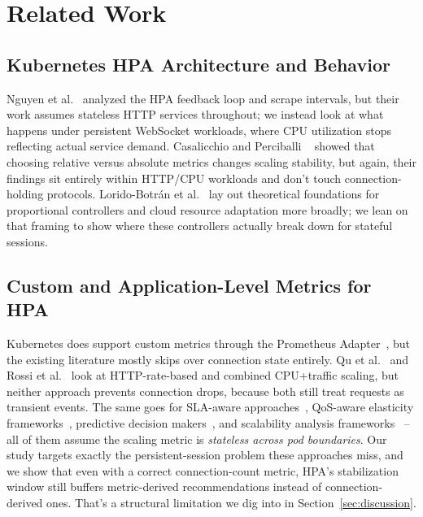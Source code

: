 \documentclass[pdflatex,sn-mathphys-num]{sn-jnl}
\theoremstyle{thmstyleone}%
\theoremstyle{thmstyletwo}%
\theoremstyle{thmstylethree}%
\begin{document}
\section{Related Work}
\label{sec:related}

\subsection{Kubernetes HPA Architecture and Behavior}

Nguyen et al.~\cite{nguyen2020hpa} analyzed the HPA feedback loop and scrape
intervals, but their work assumes stateless HTTP services throughout; we instead
look at what happens under persistent WebSocket workloads, where CPU utilization
stops reflecting actual service demand. Casalicchio and Perciballi
~\cite{casalicchio2019auto} showed that choosing relative versus absolute metrics
changes scaling stability, but again, their findings sit entirely within
HTTP/CPU workloads and don't touch connection-holding protocols. Lorido-Botr{\'a}n
et al.~\cite{lorido2014auto,lorido2016adaptation} lay out theoretical foundations
for proportional controllers and cloud resource adaptation more broadly; we lean on
that framing to show where these controllers actually break down for stateful
sessions.

\subsection{Custom and Application-Level Metrics for HPA}

Kubernetes does support custom metrics through the Prometheus
Adapter~\cite{prometheus_adapter}, but the existing literature mostly skips over
connection state entirely. Qu et al.~\cite{qu2018auto} and Rossi et
al.~\cite{rossi2020horizontal} look at HTTP-rate-based and combined CPU+traffic
scaling, but neither approach prevents connection drops, because both still treat
requests as transient events. The same goes for SLA-aware
approaches~\cite{biswas2017hybrid}, QoS-aware elasticity
frameworks~\cite{tsagkaropoulos2021severity}, predictive decision
makers~\cite{nikravesh2018genetic}, and scalability analysis
frameworks~\cite{alsaid2019scalability} -- all of them assume the scaling metric is
\textit{stateless across pod boundaries}. Our study targets exactly the
persistent-session problem these approaches miss, and we show that even with a
correct connection-count metric, HPA's stabilization window still buffers
metric-derived recommendations instead of connection-derived ones. That's a
structural limitation we dig into in Section~\ref{sec:discussion}.
\end{document}
